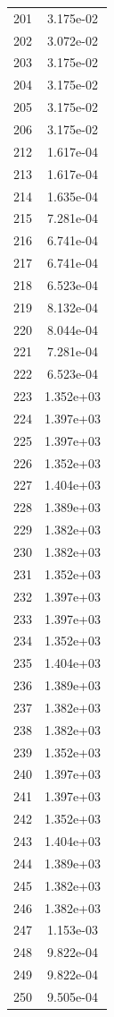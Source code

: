 \documentclass[12pt]{article}
\begin{document}
\begin{longtable}{@{}cc@{}}
201 & 3.175e-02 \\
202 & 3.072e-02 \\
203 & 3.175e-02 \\
204 & 3.175e-02 \\
205 & 3.175e-02 \\
206 & 3.175e-02 \\
212 & 1.617e-04 \\
213 & 1.617e-04 \\
214 & 1.635e-04 \\
215 & 7.281e-04 \\
216 & 6.741e-04 \\
217 & 6.741e-04 \\
218 & 6.523e-04 \\
219 & 8.132e-04 \\
220 & 8.044e-04 \\
221 & 7.281e-04 \\
222 & 6.523e-04 \\
223 & 1.352e+03 \\
224 & 1.397e+03 \\
225 & 1.397e+03 \\
226 & 1.352e+03 \\
227 & 1.404e+03 \\
228 & 1.389e+03 \\
229 & 1.382e+03 \\
230 & 1.382e+03 \\
231 & 1.352e+03 \\
232 & 1.397e+03 \\
233 & 1.397e+03 \\
234 & 1.352e+03 \\
235 & 1.404e+03 \\
236 & 1.389e+03 \\
237 & 1.382e+03 \\
238 & 1.382e+03 \\
239 & 1.352e+03 \\
240 & 1.397e+03 \\
241 & 1.397e+03 \\
242 & 1.352e+03 \\
243 & 1.404e+03 \\
244 & 1.389e+03 \\
245 & 1.382e+03 \\
246 & 1.382e+03 \\
247 & 1.153e-03 \\
248 & 9.822e-04 \\
249 & 9.822e-04 \\
250 & 9.505e-04 \\

\end{longtable}
\end{document}
